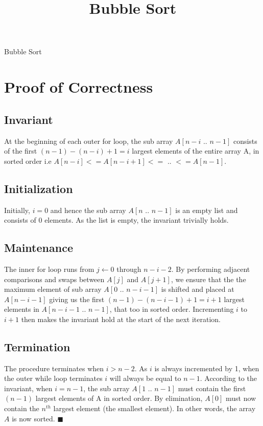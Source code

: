\documentclass[10pt,a4paper]{article}
\title{Bubble Sort}
\date{}
\begin{document}
\maketitle

\begin{algorithm}[H]
  \BlankLine
 \caption{Bubble Sort}
\end{algorithm}

\section{Proof of Correctness}
\subsection{Invariant}
At the beginning of each outer for loop, the sub array $A[n-i \text{ .. } n-1]$ consists of the first $(n-1)-(n-i)+1 = i$ largest elements of the entire array A, in sorted order i.e $A[n-i] <= A[n-i+1] <= \text{ .. } <= A[n-1]$.

\subsection{Initialization}
Initially, $i = 0$ and hence the sub array $A[n \text{ .. } n-1]$ is an empty list and consists of 0 
elements. As the list is empty, the invariant trivially holds.

\subsection{Maintenance}
The inner for loop runs from $j \leftarrow 0$ through $n-i-2$. By performing adjacent comparisons and swaps between $A[j]$ and $A[j+1]$, we ensure that the the maximum element of sub array $A[0 \text{ .. } n-i-1]$ is shifted and placed at $A[n-i-1]$ giving us the first $(n-1) - (n-i-1) + 1 = i+1$ largest elements in $A[n-i-1 \text{ .. } n-1]$, that too in sorted order. Incrementing $i$ to $i+1$ then makes the invariant hold at the start of the next iteration.

\subsection{Termination}
The procedure terminates when $ i > n-2$. As $i$ is always incremented by 1, when the
outer while loop terminates $i$ will always be equal to $n-1$. According to the invariant, 
when $i = n-1$, the sub array $A[1 \text{ .. } n-1]$ must contain the first $(n-1)$ largest elements
of A in sorted order. By elimination, $A[0]$ must now contain the $n^{th}$ largest element (the smallest element).
In other words, the array $A$ is now sorted. $\blacksquare$
\end{document}
